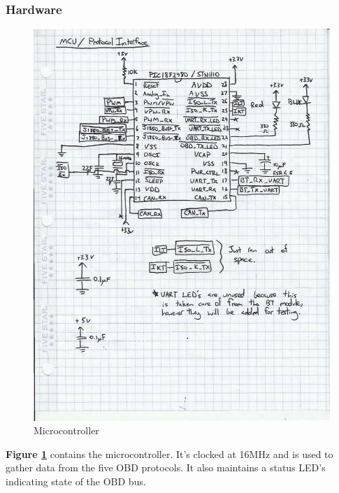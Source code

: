 \documentclass[12pt,letterpaper]{article}
\begin{document}
\subsubsection{Hardware}
\begin{figure}[H]
\centering
\includegraphics[page=1, totalheight=20cm]{images/mcu_sch.pdf}
\caption{Microcontroller}
\label{fig:mcu}
\end{figure}

\textbf{Figure \ref{fig:mcu}} contains the microcontroller. It's clocked at 16MHz and is used to gather data from the five OBD protocols. It also maintains a status LED's indicating state of the OBD bus.
\end{document}
